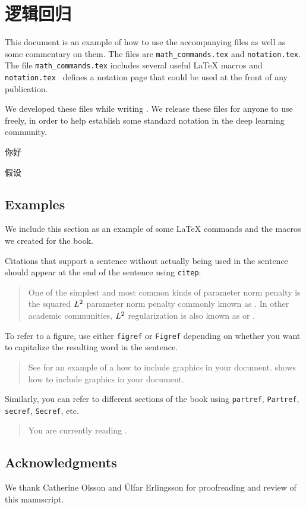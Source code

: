 \chapter{逻辑回归}
\label{chap:commentary}

This document is an example of how to use the accompanying files
as well as some commentary on them.
The files are {\tt math\_commands.tex} and {\tt notation.tex}.
The file {\tt math\_commands.tex} includes several useful {\LaTeX}
macros and {\tt notation.tex } defines a notation page that could
be used at the front of any publication.

We developed these files while writing \citet{dlbook}.
We release these files for anyone to use freely, in order to help
establish some standard notation in the deep learning community.

你好

假设
\section{Examples}
\label{sec:examples}

We include this section as an example of some {\LaTeX} commands
and the macros we created for the book.

Citations that support a sentence without actually being used in the sentence
should appear at the end of the sentence using {\tt citep}:


\begin{quote}
One of the simplest
and most common kinds of parameter norm penalty is
the squared $L^2$ parameter norm penalty
commonly known as .
In other academic communities,
$L^2$ regularization is also known as 
or .
\end{quote}

To refer to a figure, use either {\tt figref} or {\tt Figref} depending on
whether you want to capitalize the resulting word in the sentence.

\begin{quote}
See  for an example of a how to include graphics
in your document.
 shows how to include graphics in your document.
\end{quote}



Similarly, you can refer to different sections of the book using
{\tt partref}, {\tt Partref}, {\tt secref}, {\tt Secref}, etc.

\begin{quote}
	You are currently reading .
\end{quote}

\section*{Acknowledgments}
We thank Catherine Olsson and \'Ulfar Erlingsson for proofreading and
review of this manuscript.


\clearpage
